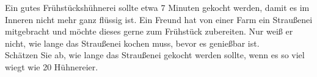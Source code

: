 \begin{Exercise}[label = Straußenei, origin = {4. Runde zur 43. IPhO 2012}, title = Straußenei, difficulty = 2]
Ein gutes Frühstückshühnerei sollte etwa 7 Minuten gekocht werden, damit es im Inneren nicht mehr
ganz flüssig ist. Ein Freund hat von einer Farm ein Straußenei mitgebracht und möchte dieses gerne
zum Frühstück zubereiten. Nur weiß er nicht, wie lange das Straußenei kochen muss, bevor es genießbar
ist.\\
Schätzen Sie ab, wie lange das Straußenei gekocht werden sollte, wenn es so viel wiegt wie 20 Hühnereier.
\end{Exercise}
